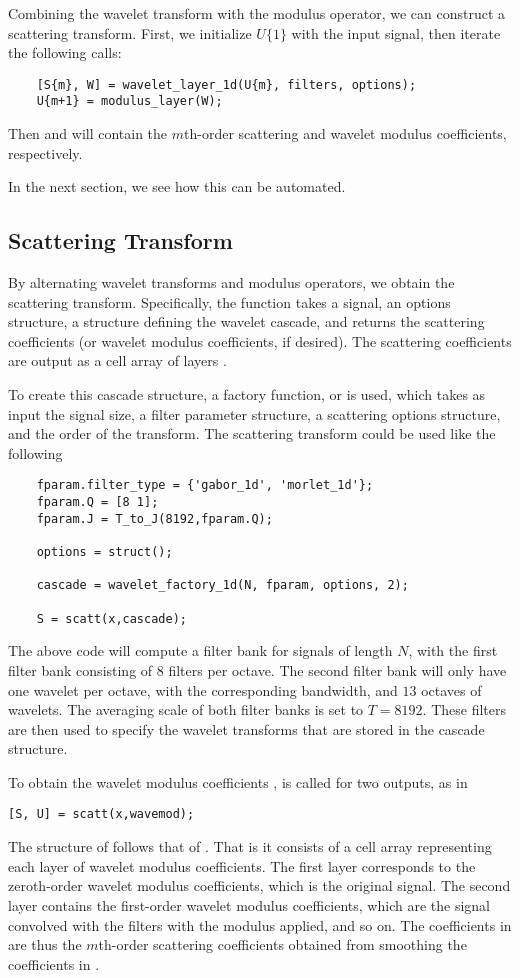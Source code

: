 \documentclass[twocolumn]{article}
\begin{document}
Combining the wavelet transform with the modulus operator, we can construct a scattering transform. First, we initialize $U\{1\}$ with the input signal, then iterate the following calls:
\begin{lstlisting}
	[S{m}, W] = wavelet_layer_1d(U{m}, filters, options);
	U{m+1} = modulus_layer(W);
\end{lstlisting}
Then  and  will contain the $m$th-order scattering and wavelet modulus coefficients, respectively.

In the next section, we see how this can be automated.

\subsection{Scattering Transform}

By alternating wavelet transforms and modulus operators, we obtain the scattering transform. Specifically, the  function takes a signal, an options structure, a structure defining the wavelet cascade, and returns the scattering coefficients (or wavelet modulus coefficients, if desired). The scattering coefficients are output as a cell array of layers .

To create this cascade structure, a factory function,  or  is used, which takes as input the signal size, a filter parameter structure, a scattering options structure, and the order of the transform. The scattering transform could be used like the following
\begin{lstlisting}
	fparam.filter_type = {'gabor_1d', 'morlet_1d'};
	fparam.Q = [8 1];
	fparam.J = T_to_J(8192,fparam.Q);
	
	options = struct();
	
	cascade = wavelet_factory_1d(N, fparam, options, 2);
	
	S = scatt(x,cascade);
\end{lstlisting}
The above code will compute a filter bank for signals of length $N$, with the first filter bank consisting of $8$ filters per octave. The second filter bank will only have one wavelet per octave, with the corresponding bandwidth, and $13$ octaves of wavelets. The averaging scale of both filter banks is set to $T = 8192$. These filters are then used to specify the wavelet transforms that are stored in the cascade structure.

To obtain the wavelet modulus coefficients ,  is called for two outputs, as in
\begin{lstlisting}
[S, U] = scatt(x,wavemod);
\end{lstlisting}
The structure of  follows that of . That is it consists of a cell array representing each layer of wavelet modulus coefficients. The first layer corresponds to the zeroth-order wavelet modulus coefficients, which is the original signal. The second layer contains the first-order wavelet modulus coefficients, which are the signal convolved with the filters with the modulus applied, and so on. The coefficients in  are thus the $m$th-order scattering coefficients obtained from smoothing the coefficients in .
\end{document}
